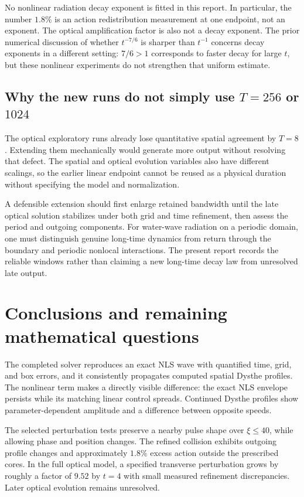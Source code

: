 \documentclass[10pt,letterpaper]{article}
\numberwithin{equation}{section}
\begin{document}
No nonlinear radiation decay exponent is fitted in this report. In particular, the number $1.8\%$ is an action redistribution measurement at one endpoint, not an exponent. The optical amplification factor is also not a decay exponent. The prior numerical discussion of whether $t^{-7/6}$ is sharper than $t^{-1}$ concerns decay exponents in a different setting: $7/6>1$ corresponds to faster decay for large $t$, but these nonlinear experiments do not strengthen that uniform estimate.

\subsection{Why the new runs do not simply use $T=256$ or $1024$}
The optical exploratory runs already lose quantitative spatial agreement by $T=8$. Extending them mechanically would generate more output without resolving that defect. The spatial and optical evolution variables also have different scalings, so the earlier linear endpoint cannot be reused as a physical duration without specifying the model and normalization.

A defensible extension should first enlarge retained bandwidth until the late optical solution stabilizes under both grid and time refinement, then assess the period and outgoing components. For water-wave radiation on a periodic domain, one must distinguish genuine long-time dynamics from return through the boundary and periodic nonlocal interactions. The present report records the reliable windows rather than claiming a new long-time decay law from unresolved late output.

\section{Conclusions and remaining mathematical questions}
The completed solver reproduces an exact NLS wave with quantified time, grid, and box errors, and it consistently propagates computed spatial Dysthe profiles. The nonlinear term makes a directly visible difference: the exact NLS envelope persists while its matching linear control spreads. Continued Dysthe profiles show parameter-dependent amplitude and a difference between opposite speeds.

The selected perturbation tests preserve a nearby pulse shape over $\xi\leq40$, while allowing phase and position changes. The refined collision exhibits outgoing profile changes and approximately $1.8\%$ excess action outside the prescribed cores. In the full optical model, a specified transverse perturbation grows by roughly a factor of $9.52$ by $t=4$ with small measured refinement discrepancies. Later optical evolution remains unresolved.
\end{document}
